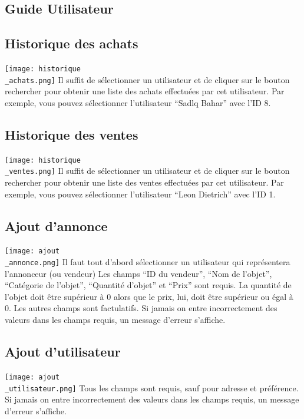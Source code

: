 \documentclass[a4paper,12pt]{article}
\begin{document}
\begin{spacing}{1}
	\section*{Guide Utilisateur}
	\subsection*{Historique des achats}
	\texttt{[image: historique\\\_achats.png]}
Il suffit de sélectionner un utilisateur et de cliquer sur le bouton rechercher pour obtenir une liste des achats effectuées par cet utilisateur. Par exemple, vous pouvez sélectionner l'utilisateur ``Sadlq Bahar'' avec l'ID 8.
    \subsection*{Historique des ventes}
    \texttt{[image: historique\\\_ventes.png]}
Il suffit de sélectionner un utilisateur et de cliquer sur le bouton rechercher pour obtenir une liste des ventes effectuées par cet utilisateur. Par exemple, vous pouvez sélectionner l'utilisateur ``Leon Dietrich'' avec l'ID 1.
    \subsection*{Ajout d'annonce}
    \texttt{[image: ajout\\\_annonce.png]}
Il faut tout d'abord sélectionner un utilisateur qui représentera l'annonceur (ou vendeur)
Les champs ``ID du vendeur'', ``Nom de l'objet'', ``Catégorie de l'objet'', ``Quantité d'objet'' et  ``Prix'' sont requis.
La quantité de l'objet doit être supérieur à 0 alors que le prix, lui, doit être supérieur ou égal à 0.
Les autres champs sont factulatifs. Si jamais on entre incorrectement des valeurs dans les champs requis, un message d'erreur s'affiche.

    \subsection*{Ajout d'utilisateur}
    \texttt{[image: ajout\\\_utilisateur.png]}
Tous les champs sont requis, sauf pour adresse et préférence. Si jamais on entre incorrectement des valeurs dans les champs requis, un message d'erreur s'affiche.


\end{spacing}
\end{document}
